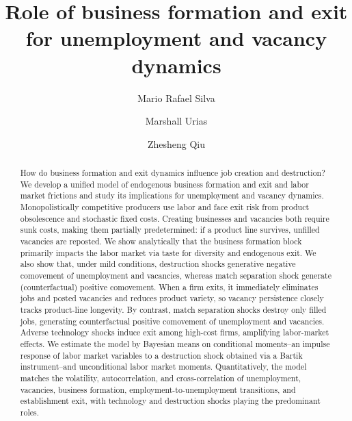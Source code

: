 \documentclass[authoryear, review, 12pt]{elsarticle}
\begin{document}
	\begin{frontmatter}
		\begin{abstract}
			How do business formation and exit dynamics influence job creation and destruction? We develop a unified model of endogenous business formation and exit and labor market frictions and study its implications for unemployment and vacancy dynamics. Monopolistically competitive producers use labor and face exit risk from product obsolescence and stochastic fixed costs. Creating businesses and vacancies both require sunk costs, making them partially predetermined: if a product line survives, unfilled vacancies are reposted. We show analytically that the business formation block primarily impacts the labor market via taste for diversity and endogenous exit. We also show that, under mild conditions, destruction shocks generative negative comovement of unemployment and vacancies, whereas match separation shock generate (counterfactual) positive comovement. When a firm exits, it immediately eliminates jobs and posted vacancies and reduces product variety, so vacancy persistence closely tracks product-line longevity. By contrast, match separation shocks destroy only filled jobs, generating counterfactual positive comovement of unemployment and vacancies.
			Adverse technology shocks induce exit among high-cost firms, amplifying labor-market effects. We estimate the model by Bayesian means on conditional moments--an impulse response of labor market variables to a destruction shock obtained via a Bartik instrument--and unconditional labor market moments.
			Quantitatively, the model matches the volatility, autocorrelation, and cross-correlation of unemployment, vacancies, business formation, employment-to-unemployment transitions, and establishment exit, with technology and destruction shocks playing the predominant roles.
		\end{abstract}
		
		\title{Role of business formation and exit for unemployment and vacancy dynamics}
		\author[affil1]{Mario Rafael Silva}
		\author[affil2]{Marshall Urias}
		\address[affil1]{Department of Accountancy, Economics, and Finance, Hong Kong Baptist University}
		\address[affil2]{Peking University HSBC Business School}
		\author[affil3]{Zhesheng Qiu}
		\address[affil3]{Hong Kong University of Science and Technology}
		\fntext[]{}
	\end{frontmatter}
\end{document}
